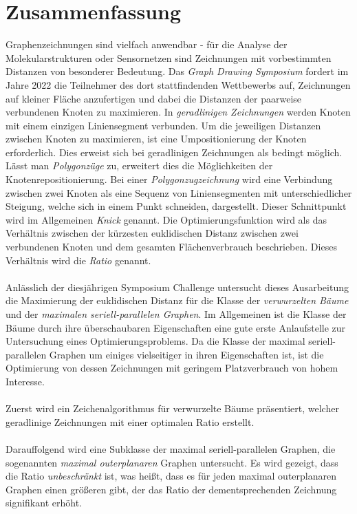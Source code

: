 \section*{Zusammenfassung}
Graphenzeichnungen sind vielfach anwendbar - für die Analyse der Molekularstrukturen oder Sensornetzen sind Zeichnungen mit vorbestimmten Distanzen von besonderer Bedeutung. Das \emph{Graph Drawing Symposium} fordert im Jahre 2022 die Teilnehmer des dort stattfindenden Wettbewerbs auf, Zeichnungen auf kleiner Fläche anzufertigen und dabei die Distanzen der paarweise verbundenen Knoten zu maximieren. In \emph{geradlinigen Zeichnungen} werden Knoten mit einem einzigen Liniensegment verbunden. Um die jeweiligen Distanzen zwischen Knoten zu maximieren, ist eine Umpositionierung der Knoten erforderlich. Dies erweist sich bei geradlinigen Zeichnungen als bedingt möglich. Lässt man \emph{Polygonzüge} zu, erweitert dies die Möglichkeiten der Knotenrepositionierung. Bei einer \emph{Polygonzugzeichnung} wird eine Verbindung zwischen zwei Knoten als eine Sequenz von Liniensegmenten mit unterschiedlicher Steigung, welche sich in einem Punkt schneiden, dargestellt. Dieser Schnittpunkt wird im Allgemeinen \emph{Knick} genannt. Die Optimierungsfunktion wird als das Verhältnis zwischen der kürzesten euklidischen Distanz zwischen zwei verbundenen Knoten und dem gesamten Flächenverbrauch beschrieben. Dieses Verhältnis wird die \emph{Ratio} genannt.
\\\\
Anlässlich der diesjährigen Symposium Challenge untersucht dieses Ausarbeitung die Maximierung der euklidischen Distanz für die Klasse der \emph{verwurzelten Bäume} und der \emph{maximalen seriell-parallelen Graphen}. Im Allgemeinen ist die Klasse der Bäume durch ihre überschaubaren Eigenschaften eine gute erste Anlaufstelle zur Untersuchung eines Optimierungsproblems. Da die Klasse der maximal seriell-parallelen Graphen um einiges vielseitiger in ihren Eigenschaften ist, ist die Optimierung von dessen Zeichnungen mit geringem Platzverbrauch von hohem Interesse.
\\\\
Zuerst wird ein Zeichenalgorithmus für verwurzelte Bäume präsentiert, welcher geradlinige Zeichnungen mit einer optimalen Ratio erstellt.\\\\
Darauffolgend wird eine Subklasse der maximal seriell-parallelen Graphen, die sogenannten \emph{maximal outerplanaren} Graphen untersucht. Es wird gezeigt, dass die Ratio \emph{unbeschränkt} ist, was heißt, dass es für jeden maximal outerplanaren Graphen einen größeren gibt, der das Ratio der dementsprechenden Zeichnung signifikant erhöht.\\
